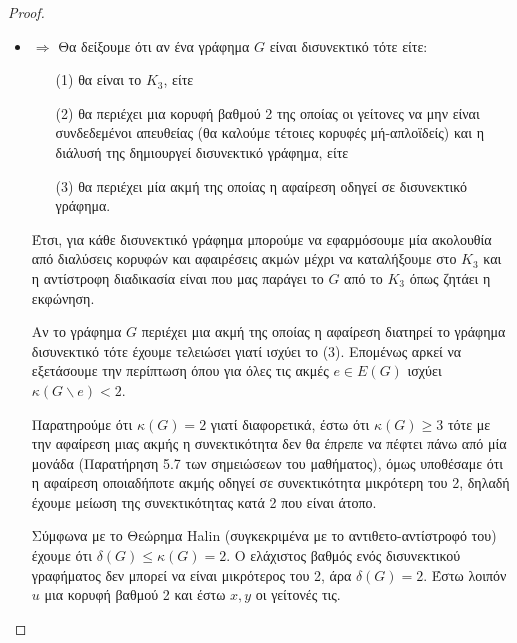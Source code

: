 \documentclass[a4paper, oneside, 11pt]{article}
\theoremstyle{definition}
\begin{document}
\begin{enumerate}
\begin{proof}
\begin{itemize}
            \item $\Rightarrow$
               Θα δείξουμε ότι αν ένα γράφημα $G$ είναι δισυνεκτικό τότε
               είτε:
               \begin{enumerate}
               \item[(1)] θα είναι το $K_3$, είτε
               \item[(2)] θα περιέχει μια κορυφή
               βαθμού 2 της οποίας οι γείτονες να μην είναι συνδεδεμένοι
               απευθείας
               (θα καλούμε τέτοιες κορυφές μή-απλοϊδείς) και η διάλυσή
               της δημιουργεί δισυνεκτικό γράφημα, είτε
               \item[(3)] θα περιέχει
               μία ακμή της οποίας η αφαίρεση οδηγεί σε δισυνεκτικό
               γράφημα.
               \end{enumerate}

               Έτσι, για κάθε δισυνεκτικό γράφημα μπορούμε να εφαρμόσουμε
               μία ακολουθία από διαλύσεις κορυφών και αφαιρέσεις ακμών
               μέχρι να καταλήξουμε στο $K_3$ και η αντίστροφη διαδικασία
               είναι που μας παράγει το $G$ από το $K_3$ όπως ζητάει η
               εκφώνηση.

               Αν το γράφημα $G$ περιέχει μια ακμή της οποίας η αφαίρεση
               διατηρεί το γράφημα δισυνεκτικό τότε έχουμε τελειώσει γιατί
               ισχύει το (3). Επομένως αρκεί να εξετάσουμε την περίπτωση
               όπου για όλες τις ακμές $e \in E(G)$ ισχύει
               $\kappa(G \backslash e) < 2$.

               Παρατηρούμε ότι $\kappa(G) = 2$ γιατί διαφορετικά, έστω
               ότι $\kappa(G) \geq 3$ τότε με την αφαίρεση μιας ακμής
               η συνεκτικότητα δεν θα έπρεπε να πέφτει πάνω από μία
               μονάδα (Παρατήρηση 5.7 των σημειώσεων του μαθήματος),
               όμως υποθέσαμε ότι η αφαίρεση οποιαδήποτε ακμής
               οδηγεί σε συνεκτικότητα μικρότερη του 2, δηλαδή έχουμε
               μείωση της συνεκτικότητας κατά 2 που είναι άτοπο.

               Σύμφωνα με το Θεώρημα Halin (συγκεκριμένα με το
               αντιθετο-αντίστροφό του) έχουμε ότι $\delta(G) \leq \kappa(G)
               = 2$. Ο ελάχιστος βαθμός ενός δισυνεκτικού γραφήματος
               δεν μπορεί να είναι μικρότερος του 2, άρα $\delta(G) = 2$.
               Έστω λοιπόν $u$ μια κορυφή βαθμού 2 και έστω $x, y$ οι
               γείτονές τις.


\end{itemize}
\end{proof}
\end{enumerate}
\end{document}
